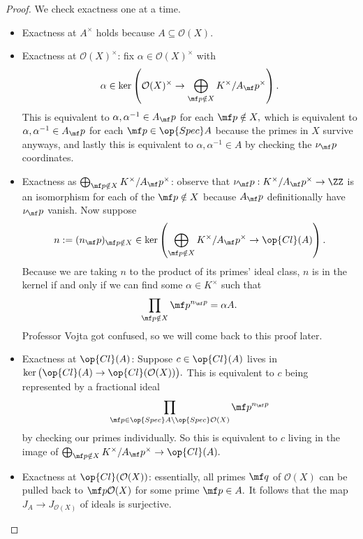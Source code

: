 \begin{proof}
    We check exactness one at a time.
    \begin{itemize}
        \item Exactness at $A^\times$ holds because $A\subseteq\mathcal O(X).$
        \item Exactness at $\mathcal O(X)^\times$: fix $\alpha\in\mathcal O(X)^\times$ with
        \[\alpha\in\ker\left(\mathcal O(X)^\times\to\bigoplus_{\mf p\notin X}K^\times/A_\mf p^\times\right).\]
        This is equivalent to $\alpha,\alpha^{-1}\in A_\mf p$ for each $\mf p\notin X,$ which is equivalent to $\alpha,\alpha^{-1}\in A_\mf p$ for each $\mf p\in\op{Spec}A$ because the primes in $X$ survive anyways, and lastly this is equivalent to $\alpha,\alpha^{-1}\in A$ by checking the $\nu_\mf p$ coordinates.
        \item Exactness as $\bigoplus_{\mf p\notin X}K^\times/A_\mf p^\times$: observe that $\nu_\mf p:K^\times/A_\mf p^\times\to\ZZ$ is an isomorphism for each of the $\mf p\notin X$ because $A_\mf p$ definitionally have $\nu_\mf p$ vanish. Now suppose
        \[n:=(n_\mf p)_{\mf p\notin X}\in\ker\left(\bigoplus_{\mf p\notin X}K^\times/A_\mf p^\times\to\op{Cl}(A)\right).\]
        Because we are taking $n$ to the product of its primes' ideal class, $n$ is in the kernel if and only if we can find some $\alpha\in K^\times$ such that
        \[\prod_{\mf p\notin X}\mf p^{n_\mf p}=\alpha A.\]
        Professor Vojta got confused, so we will come back to this proof later. \todo{}
        \item Exactness at $\op{Cl}(A)$: Suppose $c\in\op{Cl}(A)$ lives in $\ker\big(\op{Cl}(A)\to\op{Cl}(\mathcal O(X))\big).$ This is equivalent to $c$ being represented by a fractional ideal
        \[\prod_{\mf p\in\op{Spec}A\setminus\op{Spec}\mathcal O(X)}\mf p^{n_\mf p}\]
        by checking our primes individually.  So this is equivalent to $c$ living in the image of $\bigoplus_{\mf p\notin X}K^\times/A_\mf p^\times\to\op{Cl}(A).$
        \item Exactness at $\op{Cl}(\mathcal O(X))$: essentially, all primes $\mf q$ of $\mathcal O(X)$ can be pulled back to $\mf p\mathcal O(X)$ for some prime $\mf p\in A.$ It follows that the map $J_A\to J_{\mathcal O(X)}$ of ideals is surjective.
        \qedhere
    \end{itemize}
\end{proof}

